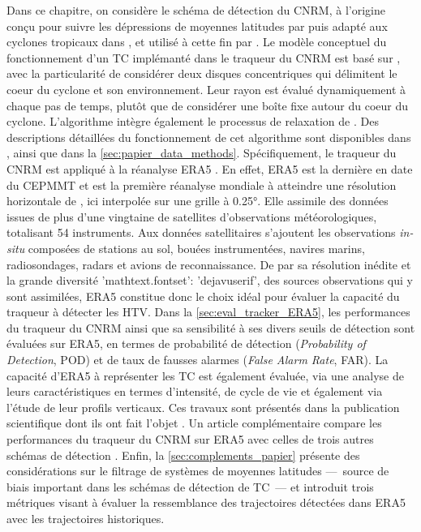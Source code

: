 \documentclass[../main.tex]{subfiles}
\begin{document}
Dans ce chapitre, on considère le schéma de détection du CNRM, à l'origine conçu pour suivre les dépressions de moyennes latitudes par
\textcite{ayrault_nouvelle_2000} puis adapté aux cyclones tropicaux dans \textcite{chauvin_response_2006}, et utilisé à cette fin par
\textcite{daloz_impact_2012,chauvin_atlantic_2017,chauvin_future_2020,cattiaux_projected_2020}. Le modèle conceptuel du fonctionnement d'un TC implémanté dans
le traqueur du CNRM est basé sur \textcite{bengtsson_hurricanetype_1995}, avec la particularité de considérer deux disques concentriques qui délimitent le coeur
du cyclone et son environnement. Leur rayon est évalué dynamiquement à chaque pas de temps, plutôt que de considérer une boîte fixe autour du coeur du cyclone.
L'algorithme intègre également le processus de relaxation de \textcite{camargo_improving_2002}. Des descriptions détaillées du fonctionnement de cet algorithme
sont disponibles dans \textcite{chauvin_response_2006}, ainsi que dans la \cref{sec:papier_data_methods}. Spécifiquement, le traqueur du CNRM est appliqué à la
réanalyse ERA5 \parencite{hersbach_era5_2020}. En effet, ERA5 est la dernière en date du CEPMMT et est la première réanalyse mondiale à atteindre une résolution
horizontale de , ici interpolée sur une grille à \ang{0.25}. Elle assimile des données issues de plus d'une vingtaine de satellites d'observations
météorologiques, totalisant \num{54} instruments. Aux données satellitaires s'ajoutent les observations \textit{in-situ} composées de stations au sol, bouées
instrumentées, navires marins, radiosondages, radars et avions de reconnaissance. De par sa résolution inédite et la grande diversité     'mathtext.fontset':
'dejavuserif', des sources observations qui y sont assimilées, ERA5 constitue donc le choix idéal pour évaluer la capacité du traqueur à détecter les HTV. Dans
la \cref{sec:eval_tracker_ERA5}, les performances du traqueur du CNRM ainsi que sa sensibilité à ses divers seuils de détection sont évaluées sur ERA5, en
termes de probabilité de détection (\textit{Probability of Detection}, POD) et de taux de fausses alarmes (\textit{False Alarm Rate}, FAR). La capacité d'ERA5 à
représenter les TC est également évaluée, via une analyse de leurs caractéristiques en termes d'intensité, de cycle de vie et également via l'étude de leur
profils verticaux. Ces travaux sont présentés dans la publication scientifique dont ils ont fait l'objet \parencite{dulac_assessing_2023}. Un article
complémentaire compare les performances du traqueur du CNRM sur ERA5 avec celles de trois autres schémas de détection \parencite{bourdin_intercomparison_2022}.
Enfin, la \cref{sec:complements_papier} présente des considérations sur le filtrage de systèmes de moyennes latitudes ---~source de biais important dans les
schémas de détection de TC~--- et introduit trois métriques visant à évaluer la ressemblance des trajectoires détectées dans ERA5 avec les trajectoires
historiques.
\end{document}

